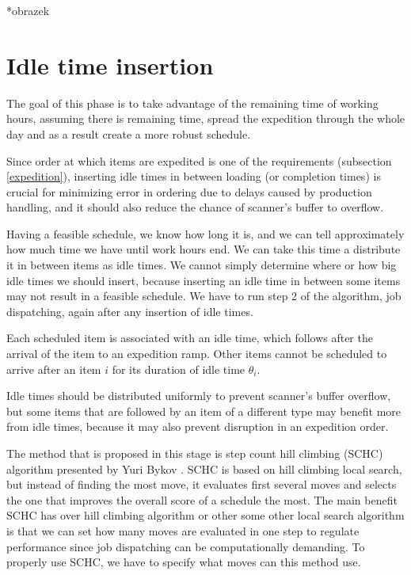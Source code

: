 \documentclass{ctuthesis}
\begin{document}
*obrazek

\section{Idle time insertion}

The goal of this phase is to take advantage of the remaining time of working hours, assuming there is remaining time, spread the expedition through the whole day and as a result create a more robust schedule. 

Since order at which items are expedited is one of the requirements (subsection \ref{expedition}), inserting idle times in between loading (or completion times) is crucial for minimizing error in ordering due to delays caused by production handling, and it should also reduce the chance of scanner's buffer to overflow.

Having a feasible schedule, we know how long it is, and we can tell approximately how much time we have until work hours end. We can take this time a distribute it in between items as idle times. We cannot simply determine where or how big idle times we should insert, because inserting an idle time in between some items may not result in a feasible schedule. We have to run step 2 of the algorithm, job dispatching, again after any insertion of idle times.

Each scheduled item is associated with an idle time, which follows after the arrival of the item to an expedition ramp. Other items cannot be scheduled to arrive after an item $i$ for its duration of idle time $\theta_i$.

Idle times should be distributed uniformly to prevent scanner's buffer overflow, but some items that are followed by an item of a different type may benefit more from idle times, because it may also prevent disruption in an expedition order.

The method that is proposed in this stage is step count hill climbing (SCHC) algorithm presented by Yuri Bykov \cite{yuri}. SCHC is based on hill climbing local search, but instead of finding the most move, it evaluates first several moves and selects the one that improves the overall score of a schedule the most. The main benefit SCHC has over hill climbing algorithm or other some other local search algorithm is that we can set how many moves are evaluated in one step to regulate performance since job dispatching can be computationally demanding. To properly use SCHC, we have to specify what moves can this method use. 
\end{document}
